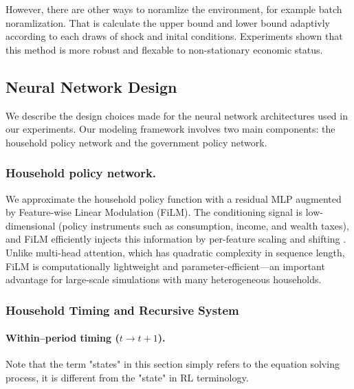 \documentclass[11pt]{article}
\begin{document}
However, there are other ways to noramlize the environment, for example batch noramlization. That is calculate the upper bound and lower bound adaptivly according to each draws of shock and inital conditions. Experiments shown that this method is more robust and flexable to non-stationary economic status.

\pagebreak

\subsection{Neural Network Design}
We describe the design choices made for the neural network architectures used in our experiments. 
Our modeling framework involves two main components: the household policy network and the government policy network.

\subsubsection{Household policy network.}
We approximate the household policy function with a residual MLP augmented by Feature-wise Linear Modulation (FiLM). 
The conditioning signal is low-dimensional (policy instruments such as consumption, income, and wealth taxes), and FiLM efficiently injects this information by per-feature scaling and shifting \cite{Perez2018FiLM}. 
Unlike multi-head attention, which has quadratic complexity in sequence length, FiLM is computationally lightweight and parameter-efficient—an important advantage for large-scale simulations with many heterogeneous households. 

\subsubsection{Household Timing and Recursive System}

\paragraph{Within–period timing ($t \to t+1$).}
Note that the term "states" in this section simply refers to the equation solving process, it is different from the "state" in RL terminology.
\end{document}
